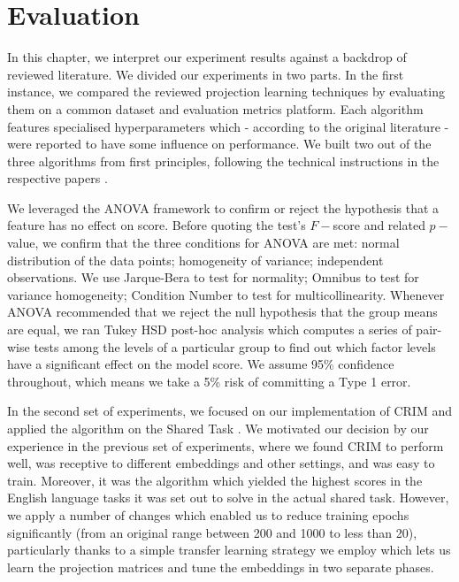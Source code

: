 \chapter{Evaluation}
In this chapter, we interpret our experiment results against a backdrop of reviewed literature.  We divided our experiments in two parts.  In the first instance, we compared the reviewed projection learning techniques by evaluating them on a common dataset and evaluation metrics platform.  Each algorithm features specialised hyperparameters which - according to the original literature - were reported to have some influence on performance.  We built two out of the three algorithms from first principles, following the technical instructions in the respective papers \citep{ustalov2017negative, bernier2018crim}.  

We leveraged the \ac{ANOVA} framework to confirm or reject the hypothesis that a feature has no effect on score.  Before quoting the test's $F-$score and related $p-$value, we confirm that the three conditions for \ac{ANOVA} are met: normal distribution of the data points; homogeneity of variance; independent observations.  We use Jarque-Bera to test for normality; Omnibus to test for variance homogeneity; Condition Number to test for multicollinearity.  Whenever \ac{ANOVA} recommended that we reject the null hypothesis that the group means are equal, we ran Tukey \ac{HSD} post-hoc analysis which computes a series of pair-wise tests among the levels of a particular group to find out which factor levels have a significant effect on the model score.  We assume 95\% confidence throughout, which means we take a 5\% risk of committing a Type 1 error.

In the second set of experiments, we focused on our implementation of CRIM \citep{bernier2018crim} and applied the algorithm on the Shared Task \citep{camacho2018semeval}.  We motivated our decision by our experience in the previous set of experiments, where we found CRIM to perform well, was receptive to different embeddings and other settings, and was easy to train.  Moreover, it was the algorithm which yielded the highest scores in the English language tasks it was set out to solve in the actual shared task.  However, we apply a number of changes which enabled us to reduce training epochs significantly (from an original range between 200 and 1000 to less than 20), particularly thanks to a simple transfer learning strategy we employ which lets us learn the projection matrices and tune the embeddings in two separate phases.

